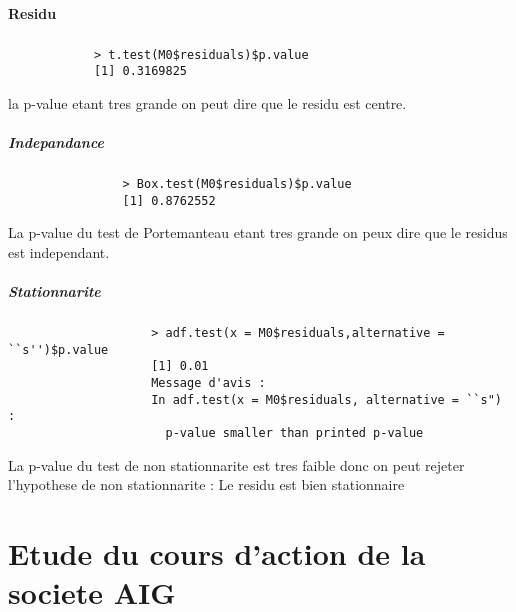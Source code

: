         \paragraph{Residu}
            \subparagraph{}
            \begin{verbatim}
            > t.test(M0$residuals)$p.value
            [1] 0.3169825
            \end{verbatim}
            la p-value etant tres grande on peut dire que le residu est
           centre. 
            \subparagraph{Indepandance}
                \begin{verbatim}
                > Box.test(M0$residuals)$p.value
                [1] 0.8762552
                \end{verbatim}
                La p-value du test de Portemanteau etant tres grande on peux dire
                que le residus est independant.
            \subparagraph{Stationnarite}
                \begin{verbatim}
                    > adf.test(x = M0$residuals,alternative = ``s'')$p.value
                    [1] 0.01
                    Message d'avis :
                    In adf.test(x = M0$residuals, alternative = ``s") :
                      p-value smaller than printed p-value
                \end{verbatim}
                La p-value du test de non  stationnarite est tres faible donc on
                peut rejeter l'hypothese de non stationnarite : Le residu est
                bien stationnaire

\section{Etude du cours d'action de la societe AIG}
